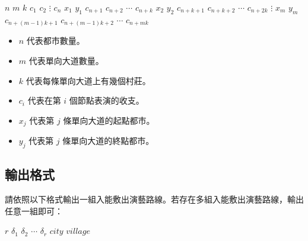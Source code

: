 \begin{format}
\f{
$n$ $m$ $k$
$c_1$
$c_2$
$\vdots$
$c_n$
$x_1$ $y_1$ $c_{n+1}$ $c_{n+2}$ $\cdots$ $c_{n+k}$
$x_2$ $y_2$ $c_{n+k+1}$ $c_{n+k+2}$ $\cdots$ $c_{n+2k}$
$\vdots$
$x_{m}$ $y_{m}$ $c_{n+(m-1)k+1}$ $c_{n+(m-1)k+2}$ $\cdots$ $c_{n+mk}$
}
\end{format}

\begin{itemize}
\tightlist
\item
  \begin{math}n\end{math} 代表都市數量。
\item
  \begin{math}m\end{math} 代表單向大道數量。
\item
  \begin{math}k\end{math} 代表每條單向大道上有幾個村莊。
\item
  \begin{math}c_i\end{math} 代表在第 \begin{math}i\end{math}
  個節點表演的收支。
\item
  \begin{math}x_j\end{math} 代表第 \begin{math}j\end{math}
  條單向大道的起點都市。
\item
  \begin{math}y_j\end{math} 代表第 \begin{math}j\end{math}
  條單向大道的終點都市。
\end{itemize}

\subsection{輸出格式}

請依照以下格式輸出一組入能敷出演藝路線。若存在多組入能敷出演藝路線，輸出任意一組即可：

\begin{format}
\f{
$r$
$\delta_1$ $\delta_2$ $\cdots$ $\delta_r$
$city$ $village$
}
\end{format}

